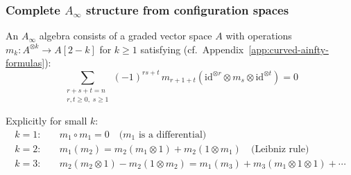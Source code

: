 \subsubsection{\texorpdfstring{Complete $A_\infty$ structure from configuration spaces}{Complete A-infinity structure from configuration spaces}}

\begin{definition}\label{def:a-infinity-complete}
An $A_\infty$ algebra consists of a graded vector space $A$ with operations $m_k: A^{\otimes k} \to A[2-k]$ for $k \geq 1$ satisfying (cf.\ Appendix~\ref{app:curved-ainfty-formulas}):
\[\sum_{\substack{r+s+t=n \\ r,t \geq 0,\; s \geq 1}} (-1)^{rs+t}\, m_{r+1+t}(\mathrm{id}^{\otimes r} \otimes m_s \otimes \mathrm{id}^{\otimes t}) = 0\]

Explicitly for small $k$:
\begin{align}
k=1: &\quad m_1 \circ m_1 = 0 \quad \text{($m_1$ is a differential)} \\
k=2: &\quad m_1(m_2) = m_2(m_1 \otimes 1) + m_2(1 \otimes m_1) \quad \text{(Leibniz rule)} \\
k=3: &\quad m_2(m_2 \otimes 1) - m_2(1 \otimes m_2) = m_1(m_3) + m_3(m_1 \otimes 1 \otimes 1) + \cdots
\end{align}
\end{definition}

